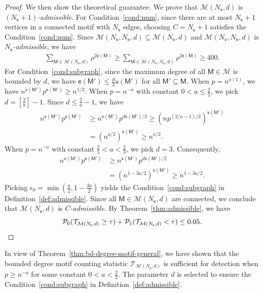 \documentclass[letterpaper,11pt]{article}
\theoremstyle{definition}
\newcommand{\maM}{\mathcal{M}}
\newcommand{\maP}{\mathcal{P}}
\newcommand{\maT}{\mathcal{T}}
\newcommand{\en}{\mathsf{{e}}}
\newcommand{\vn}{\mathsf{{v}}}
\newcommand{\pth}[1]{\left( #1 \right)}
\newcommand{\qth}[1]{\left[ #1 \right]}
\newcommand{\sfM}{{\mathsf{M}}}
\newcommand{\sfe}{{\mathsf{e}}}
\newcommand{\sfv}{{\mathsf{v}}}
\begin{document}
\begin{proof}
We then show the theoretical guarantee. We prove that $\maM(N_\sfe,d)$ is \emph{$(N_\sfe{+}1)$-admissible}.
For Condition~\ref{cond:num}, since there are at most $N_\sfe+1$ vertices in a connected motif with $N_\sfe$ edges, choosing $C = N_\sfe +1$ satisfies the Condition~\ref{cond:num}. Since $\maM(N_\sfv,N_\sfe,d)\subseteq \maM(N_\sfe,d)$ and $\maM(N_\sfv,N_\sfe,d)$ is \emph{$N_\sfe$-admissible}, we have \begin{align*}
    \sum_{\sfM\in \maM(N_\sfe,d)}\rho^{2\en(\sfM)}\ge  \sum_{\sfM\in \maM(N_\sfv, N_\sfe,d)}\rho^{2\en(\sfM)}\ge 400.
\end{align*}
For Condition~\ref{cond:subgraph}, since the maximum degree of all $\sfM\in\maM$ is bounded by $d$, we have $\en(\sfM')\le \frac{d}{2}\vn(\sfM')$ for all $\sfM'\subseteq \sfM$. When $p=n^{o(1)}$, we have $n^{\vn(\sfM')}p^{\en(\sfM')}\ge n^{1/2}$.
When $p = n^{-a}$ with constant $0<a\le \frac{2}{5}$, we pick $d = \qth{\frac{2}{a}}-1$. Since $d\le \frac{2}{a}-1$,  we have \begin{align*}
    n^{\vn(\sfM')}p^{\en(\sfM')}&\ge n^{\vn(\sfM')}p^{d\vn(\sfM')/2}\ge (np^{(2/a-1)/2})^{\vn(\sfM')}\\&=(n^{a/2})^{\vn(\sfM')}\ge n^{a/2}.
\end{align*}
When $p=n^{-a}$ with constant $\frac{2}{5}<a<\frac{2}{3}$, we pick $d=3$.
Consequently, 
\begin{align*}
    n^{\vn(\sfM')}p^{\en(\sfM')}&\ge n^{\vn(\sfM')}p^{d\vn(\sfM')/2}\\&=(n^{1-3a/2})^{\vn(\sfM')}\ge n^{1-3a/2}.
\end{align*}
Picking $\epsilon_0 = \min\pth{\frac{a}{2},1-\frac{3a}{2}}$ yields the Condition~\ref{cond:subgraph} in Definition~\ref{def:admissible}. Since all $\sfM\in \maM(N_\sfe,d)$ are connected, we conclude that $\maM(N_\sfe,d)$ is \emph{$C$-admissible}. By Theorem~\ref{thm:admissible}, we have \begin{equation*}
    \maP_0(\maT_{\maM(N_\sfe,d)}\ge\tau)+\maP_1(\maT_{\maM(N_\sfe,d)}<\tau)\le 0.05.\qedhere
\end{equation*}
\end{proof}
In view of Theorem~\ref{thm:bd-degree-motif-general}, we have shown that the bounded degree motif counting statistic $\maT_{\maM(N_\sfe,d)}$ is sufficient for detection when $p \ge n^{-a}$ for some constant $0 < a < \frac{2}{3}$. 
The parameter $d$ is selected to ensure the Condition~\ref{cond:subgraph} in Definition~\ref{def:admissible}.
\end{document}
